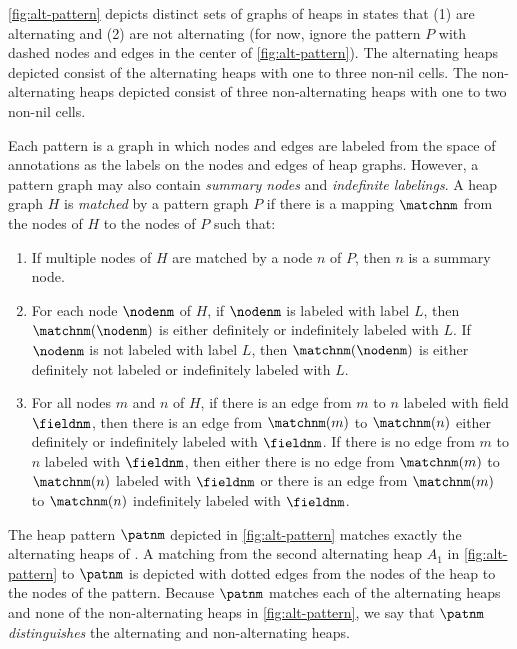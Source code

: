 \begin{ex}
  \label{ex:concrete-heaps}
  \autoref{fig:alt-pattern} depicts distinct sets of graphs of heaps
  in \altlist states that (1) are alternating and (2) are not
  alternating (for now, ignore the pattern $P$ with dashed nodes and
  edges in the center of \autoref{fig:alt-pattern}).
  The alternating heaps depicted consist of the alternating heaps with
  one to three non-nil cells.
  The non-alternating heaps depicted consist of three non-alternating
  heaps with one to two non-nil cells.
\end{ex}

Each pattern is a graph in which nodes and edges are labeled from the
space of annotations as the labels on the nodes and edges of heap
graphs.
%
However, a pattern graph may also contain \emph{summary nodes} and
\emph{indefinite labelings}.
%
A heap graph $H$ is \emph{matched} by a pattern graph $P$ if there is
a mapping $\matchnm$ from the nodes of $H$ to the nodes of $P$ such
that:
%
\begin{enumerate}
\item 
  If multiple nodes of $H$ are matched by a node $n$ of $P$, then $n$
  is a summary node.
\item 
  For each node $\nodenm$ of $H$, if $\nodenm$ is labeled with label $L$,
  then $\matchnm(\nodenm)$ is either definitely or indefinitely labeled
  with $L$.
  If $\nodenm$ is not labeled with label $L$, then $\matchnm(\nodenm)$
  is either definitely not labeled or indefinitely labeled with $L$.
\item 
  For all nodes $m$ and $n$ of $H$, if there is an edge from $m$ to
  $n$ labeled with field $\fieldnm$, then there is an edge from
  $\matchnm(m)$ to $\matchnm(n)$ either definitely or indefinitely
  labeled with $\fieldnm$.
  If there is no edge from $m$ to $n$ labeled with $\fieldnm$, then
  either there is no edge from $\matchnm(m)$ to $\matchnm(n)$ labeled
  with $\fieldnm$ or there is an edge from $\matchnm(m)$ to
  $\matchnm(n)$ indefinitely labeled with $\fieldnm$.
\end{enumerate}

\begin{ex}
  \label{ex:heap-pats}
  The heap pattern $\patnm$ depicted in \autoref{fig:alt-pattern}
  matches exactly the alternating heaps of \altlist.
  A matching from the second alternating heap $A_1$ in
  \autoref{fig:alt-pattern} to $\patnm$ is depicted with dotted edges
  from the nodes of the heap to the nodes of the pattern.
  Because $\patnm$ matches each of the alternating heaps and none of
  the non-alternating heaps in \autoref{fig:alt-pattern}, we say that
  $\patnm$ \emph{distinguishes} the alternating and non-alternating
  heaps.
\end{ex}

